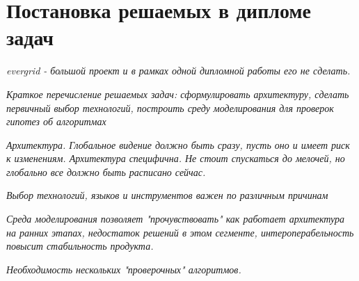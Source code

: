\chapter{Постановка решаемых в дипломе задач}

\textit{evergrid - большой проект и в рамках одной дипломной работы его не сделать.}

\textit{Краткое перечисление решаемых задач: сформулировать архитектуру, сделать первичный выбор технологий, построить среду моделирования для проверок гипотез об алгоритмах}

\textit{Архитектура. Глобальное видение должно быть сразу, пусть оно и имеет риск к изменениям. Архитектура специфична. Не стоит спускаться до мелочей, но глобально все должно быть расписано сейчас.}

\textit{Выбор технологий, языков и инструментов важен по различным причинам}

\textit{Среда моделирования позволяет "прочувствовать" как работает архитектура на ранних этапах, недостаток решений в этом сегменте, интероперабельность повысит стабильность продукта.}

\textit{Необходимость нескольких "проверочных" алгоритмов.}